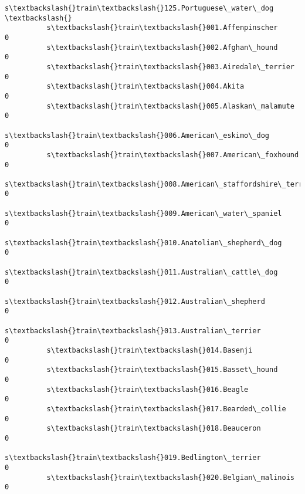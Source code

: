 \documentclass[11pt]{article}
\begin{document}
\begin{Verbatim}[commandchars=\\\{\}]
                                                          s\textbackslash{}train\textbackslash{}125.Portuguese\_water\_dog  \textbackslash{}
          s\textbackslash{}train\textbackslash{}001.Affenpinscher                                                      0   
          s\textbackslash{}train\textbackslash{}002.Afghan\_hound                                                       0   
          s\textbackslash{}train\textbackslash{}003.Airedale\_terrier                                                   0   
          s\textbackslash{}train\textbackslash{}004.Akita                                                              0   
          s\textbackslash{}train\textbackslash{}005.Alaskan\_malamute                                                   0   
          s\textbackslash{}train\textbackslash{}006.American\_eskimo\_dog                                                0   
          s\textbackslash{}train\textbackslash{}007.American\_foxhound                                                  0   
          s\textbackslash{}train\textbackslash{}008.American\_staffordshire\_terrier                                     0   
          s\textbackslash{}train\textbackslash{}009.American\_water\_spaniel                                             0   
          s\textbackslash{}train\textbackslash{}010.Anatolian\_shepherd\_dog                                             0   
          s\textbackslash{}train\textbackslash{}011.Australian\_cattle\_dog                                              0   
          s\textbackslash{}train\textbackslash{}012.Australian\_shepherd                                                0   
          s\textbackslash{}train\textbackslash{}013.Australian\_terrier                                                 0   
          s\textbackslash{}train\textbackslash{}014.Basenji                                                            0   
          s\textbackslash{}train\textbackslash{}015.Basset\_hound                                                       0   
          s\textbackslash{}train\textbackslash{}016.Beagle                                                             0   
          s\textbackslash{}train\textbackslash{}017.Bearded\_collie                                                     0   
          s\textbackslash{}train\textbackslash{}018.Beauceron                                                          0   
          s\textbackslash{}train\textbackslash{}019.Bedlington\_terrier                                                 0   
          s\textbackslash{}train\textbackslash{}020.Belgian\_malinois                                                   0   

\end{Verbatim}
\end{document}
